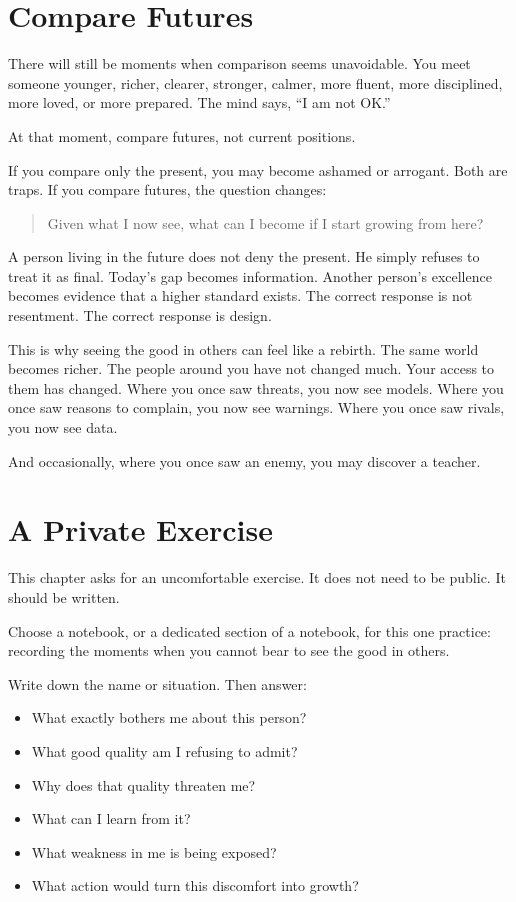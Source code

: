 \section*{Compare Futures}

There will still be moments when comparison seems unavoidable. You meet someone younger, richer, clearer, stronger, calmer, more fluent, more disciplined, more loved, or more prepared. The mind says, ``I am not OK.''

At that moment, compare futures, not current positions.

If you compare only the present, you may become ashamed or arrogant. Both are traps. If you compare futures, the question changes:

\begin{quote}
Given what I now see, what can I become if I start growing from here?
\end{quote}

A person living in the future does not deny the present. He simply refuses to treat it as final. Today's gap becomes information. Another person's excellence becomes evidence that a higher standard exists. The correct response is not resentment. The correct response is design.

This is why seeing the good in others can feel like a rebirth. The same world becomes richer. The people around you have not changed much. Your access to them has changed. Where you once saw threats, you now see models. Where you once saw reasons to complain, you now see warnings. Where you once saw rivals, you now see data.

And occasionally, where you once saw an enemy, you may discover a teacher.

\section*{A Private Exercise}

This chapter asks for an uncomfortable exercise. It does not need to be public. It should be written.

Choose a notebook, or a dedicated section of a notebook, for this one practice: recording the moments when you cannot bear to see the good in others.

Write down the name or situation. Then answer:

\begin{itemize}
\item What exactly bothers me about this person?
\item What good quality am I refusing to admit?
\item Why does that quality threaten me?
\item What can I learn from it?
\item What weakness in me is being exposed?
\item What action would turn this discomfort into growth?
\end{itemize}

